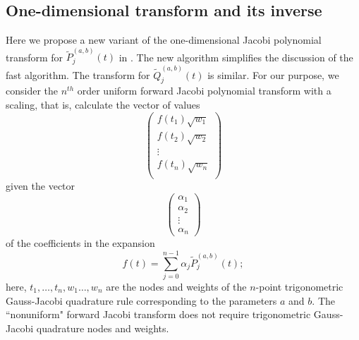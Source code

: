 \documentclass[11pt]{article}
\begin{document}
\subsection{One-dimensional transform and its inverse}
\label{sec:EOJT}
Here we propose a new variant of the one-dimensional Jacobi polynomial transform for $\tilde{P}_j^{(a,b)}(t)$ in \cite{Jacobi}. 
The new algorithm simplifies the discussion of the fast algorithm. The transform for $\tilde{Q}_j^{(a,b)}(t)$ is similar. 
For our purpose, we consider the $n^{th}$ order uniform forward Jacobi polynomial transform
 with a scaling, that is, calculate the vector  of values
\begin{equation}
\left(
\begin{array}{c}
f(t_1) \sqrt{w_1} \\
f(t_2) \sqrt{w_2} \\
\vdots\\
f(t_n) \sqrt{w_n} \\
\end{array}
\right)
\label{tf:transout}
\end{equation}
given the vector
\begin{equation}
\left(
\begin{array}{c}
\alpha_1 \\
\alpha_2\\
\vdots \\
\alpha_n
\end{array}
\right)
\label{tf:transin}
\end{equation}
of the coefficients in the expansion
\begin{equation}
f(t) = \sum_{j=0}^{n-1} \alpha_j \tilde{P}_j^{(a,b)}(t);
\label{tf:transexp}
\end{equation}
here,
 $t_1,\ldots,t_n,w_1\ldots,w_n$ are the nodes and weights
of the $n$-point trigonometric Gauss-Jacobi quadrature rule corresponding
to the parameters $a$ and $b$.  The ``nonuniform" forward Jacobi transform does not require trigonometric Gauss-Jacobi quadrature nodes and weights. 
\end{document}
